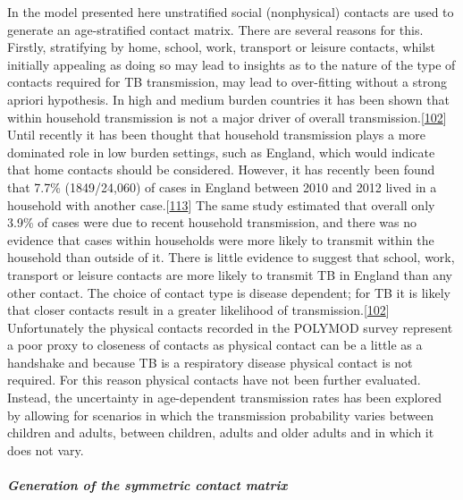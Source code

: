 \documentclass[11pt,twoside]{bristolthesis}
\begin{document}
  In the model presented here unstratified social (nonphysical) contacts are used to generate an age-stratified contact matrix. There are several reasons for this. Firstly, stratifying by home, school, work, transport or leisure contacts, whilst initially appealing as doing so may lead to insights as to the nature of the type of contacts required for TB transmission, may lead to over-fitting without a strong apriori hypothesis. In high and medium burden countries it has been shown that within household transmission is not a major driver of overall transmission.{[}\protect\hyperlink{ref-Mathema2018}{102}{]} Until recently it has been thought that household transmission plays a more dominated role in low burden settings, such as England, which would indicate that home contacts should be considered. However, it has recently been found that 7.7\% (1849/24,060) of cases in England between 2010 and 2012 lived in a household with another case.{[}\protect\hyperlink{ref-Lalor2017}{113}{]} The same study estimated that overall only 3.9\% of cases were due to recent household transmission, and there was no evidence that cases within households were more likely to transmit within the household than outside of it. There is little evidence to suggest that school, work, transport or leisure contacts are more likely to transmit TB in England than any other contact. The choice of contact type is disease dependent; for TB it is likely that closer contacts result in a greater likelihood of transmission.{[}\protect\hyperlink{ref-Mathema2018}{102}{]} Unfortunately the physical contacts recorded in the POLYMOD survey represent a poor proxy to closeness of contacts as physical contact can be a little as a handshake and because TB is a respiratory disease physical contact is not required. For this reason physical contacts have not been further evaluated. Instead, the uncertainty in age-dependent transmission rates has been explored by allowing for scenarios in which the transmission probability varies between children and adults, between children, adults and older adults and in which it does not vary.
  
  \hypertarget{generation-of-the-symmetric-contact-matrix}{%
  \subparagraph{Generation of the symmetric contact matrix}\label{generation-of-the-symmetric-contact-matrix}}
  
\end{document}
